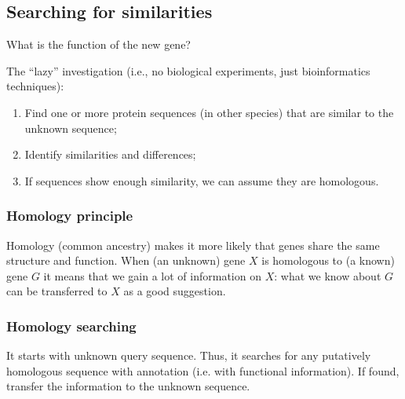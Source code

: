 \subsection{Searching for similarities}

What is the function of the new gene?

The “lazy” investigation (i.e., no biological experiments, just bioinformatics 
techniques):

\begin{enumerate}
\item Find one or more protein sequences (in other species) that are similar to 
the unknown sequence;
\item Identify similarities and differences;
\item If sequences show enough similarity, we can assume they are homologous.
\end{enumerate}

\subsubsection{Homology principle}

Homology (common ancestry) makes it more likely that genes share the same 
structure and function.
When (an unknown) gene $X$ is homologous to (a known) gene $G$ it means that we 
gain a lot of information on $X$: what we know about $G$ can be transferred to $X$ 
as a good suggestion.

\subsubsection{Homology searching}

It starts with unknown query sequence. Thus, it searches for any putatively 
homologous sequence with annotation (i.e. with functional information). 
If found, transfer the information to the unknown sequence.
